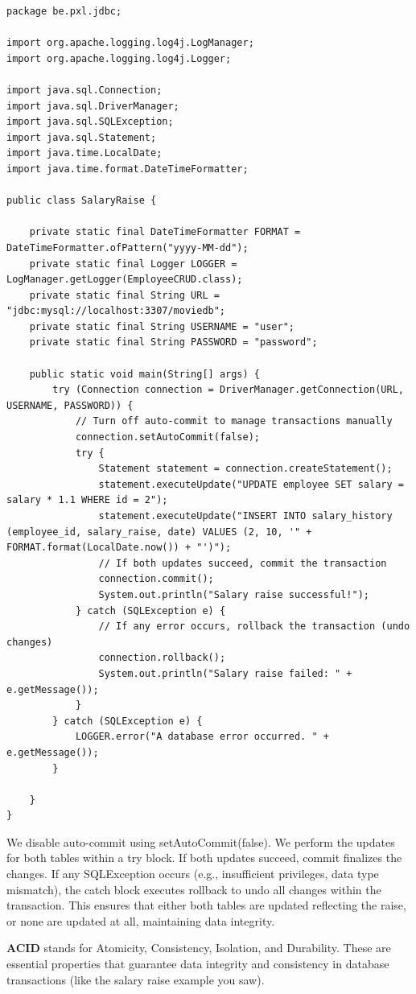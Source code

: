 \begin{lstlisting}
package be.pxl.jdbc;

import org.apache.logging.log4j.LogManager;
import org.apache.logging.log4j.Logger;

import java.sql.Connection;
import java.sql.DriverManager;
import java.sql.SQLException;
import java.sql.Statement;
import java.time.LocalDate;
import java.time.format.DateTimeFormatter;

public class SalaryRaise {

	private static final DateTimeFormatter FORMAT = DateTimeFormatter.ofPattern("yyyy-MM-dd");
	private static final Logger LOGGER = LogManager.getLogger(EmployeeCRUD.class);
	private static final String URL = "jdbc:mysql://localhost:3307/moviedb";
	private static final String USERNAME = "user";
	private static final String PASSWORD = "password";

	public static void main(String[] args) {
		try (Connection connection = DriverManager.getConnection(URL, USERNAME, PASSWORD)) {
			// Turn off auto-commit to manage transactions manually
			connection.setAutoCommit(false);
			try {
				Statement statement = connection.createStatement();
				statement.executeUpdate("UPDATE employee SET salary = salary * 1.1 WHERE id = 2");
				statement.executeUpdate("INSERT INTO salary_history (employee_id, salary_raise, date) VALUES (2, 10, '" + FORMAT.format(LocalDate.now()) + "')");
				// If both updates succeed, commit the transaction
				connection.commit();
				System.out.println("Salary raise successful!");
			} catch (SQLException e) {
				// If any error occurs, rollback the transaction (undo changes)
				connection.rollback();
				System.out.println("Salary raise failed: " + e.getMessage());
			}
		} catch (SQLException e) {
			LOGGER.error("A database error occurred. " + e.getMessage());
		}

	}
}
\end{lstlisting}

We disable auto-commit using setAutoCommit(false).
We perform the updates for both tables within a try block.
If both updates succeed, commit finalizes the changes.
If any SQLException occurs (e.g., insufficient privileges, data type mismatch), the catch block executes rollback to undo all changes within the transaction.
This ensures that either both tables are updated reflecting the raise, or none are updated at all, maintaining data integrity.


\textbf{ACID} stands for Atomicity, Consistency, Isolation, and Durability. These are essential properties that guarantee data integrity and consistency in database transactions (like the salary raise example you saw). 

